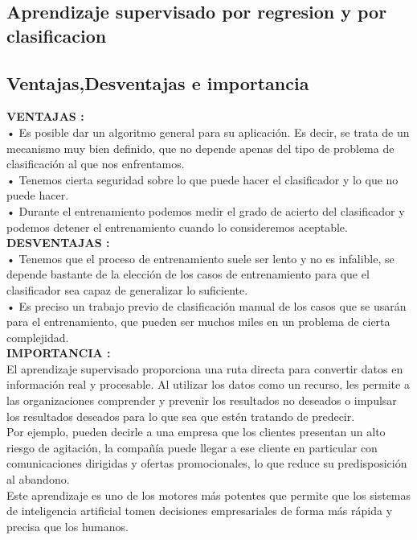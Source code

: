 \documentclass[%
 reprint,
 amsmath,amssymb,
 aps,
]{revtex4-1}
\begin{document}
\subsection{Aprendizaje supervisado por regresion y por clasificacion}

\subsection{Ventajas,Desventajas e importancia}

  \textbf{VENTAJAS :}\\ • Es posible dar un algoritmo general para su aplicación. Es decir, se trata de un mecanismo muy bien definido, que no depende apenas del tipo de problema de clasificación al que nos enfrentamos. \\
  • Tenemos cierta seguridad sobre lo que puede hacer el clasificador y lo que no puede hacer.\\ • Durante el entrenamiento podemos medir el grado de acierto del clasificador y podemos detener el entrenamiento cuando lo consideremos aceptable.\\
  
    \textbf{DESVENTAJAS :} \\• Tenemos que el proceso de entrenamiento suele ser lento y no es infalible, se depende bastante de la elección de los casos de entrenamiento para que el clasificador sea capaz de generalizar lo suficiente.\\ • Es preciso un trabajo previo de clasificación manual de los casos que se usarán para el entrenamiento, que pueden ser muchos miles en un problema de cierta complejidad.\\
    
    \textbf{IMPORTANCIA :} \\
    El aprendizaje supervisado proporciona una ruta directa para convertir datos en información real y procesable. Al utilizar los datos como un recurso, les permite a las organizaciones comprender y prevenir los resultados no deseados o impulsar los resultados deseados para lo que sea que estén tratando de predecir.\\
    Por ejemplo, pueden decirle a una empresa que los clientes presentan un alto riesgo de agitación, la compañía puede llegar a ese cliente en particular con comunicaciones dirigidas y ofertas promocionales, lo que reduce su predisposición al abandono.\\
    Este aprendizaje es uno de los motores más potentes que permite que los sistemas de inteligencia artificial tomen decisiones empresariales de forma más rápida y precisa que los humanos.
\end{document}
